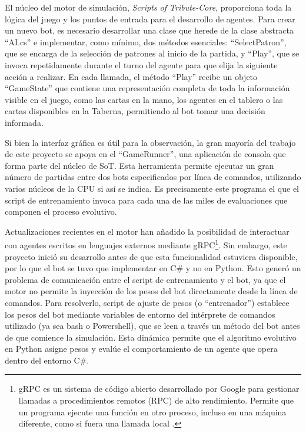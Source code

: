 El núcleo del motor de simulación, \textit{Scripts of Tribute-Core}, proporciona toda la lógica del juego y los puntos de entrada para el desarrollo de agentes. Para crear un nuevo bot, es necesario desarrollar una clase que herede de la clase abstracta ``AI.cs'' e implementar, como mínimo, dos métodos esenciales: ``SelectPatron'', que se encarga de la selección de patrones al inicio de la partida, y ``Play'', que se invoca repetidamente durante el turno del agente para que elija la siguiente acción a realizar. En cada llamada, el método ``Play'' recibe un objeto ``GameState'' que contiene una representación completa de toda la información visible en el juego, como las cartas en la mano, los agentes en el tablero o las cartas disponibles en la Taberna, permitiendo al bot tomar una decisión informada.

Si bien la interfaz gráfica es útil para la observación, la gran mayoría del trabajo de este proyecto se apoya en el ``GameRunner'', una aplicación de consola que forma parte del núcleo de SoT. Esta herramienta permite ejecutar un gran número de partidas entre dos bots especificados por línea de comandos, utilizando varios núcleos de la CPU si así se indica. Es precisamente este programa el que el script de entrenamiento invoca para cada una de las miles de evaluaciones que componen el proceso evolutivo.

Actualizaciones recientes en el motor han añadido la posibilidad de interactuar con agentes escritos en lenguajes externos mediante gRPC\footnote{gRPC es un sistema de código abierto desarrollado por Google para gestionar llamadas a procedimientos remotos (RPC) de alto rendimiento. Permite que un programa ejecute una función en otro proceso, incluso en una máquina diferente, como si fuera una llamada local \cite{google_grpc_2016}.}. Sin embargo, este proyecto inició su desarrollo antes de que esta funcionalidad estuviera disponible, por lo que el bot se tuvo que implementar en C\# y no en Python. Esto generó un problema de comunicación entre el script de entrenamiento y el bot, ya que el motor no permite la inyección de los pesos del bot directamente desde la línea de comandos. Para resolverlo, script de ajuste de pesos (o ``entrenador'') establece los pesos del bot mediante variables de entorno del intérprete de comandos utilizado (ya sea bash o Powershell), que se leen a través un método del bot antes de que comience la simulación. Esta dinámica permite que el algoritmo evolutivo en Python asigne pesos y evalúe el comportamiento de un agente que opera dentro del entorno C\#.


